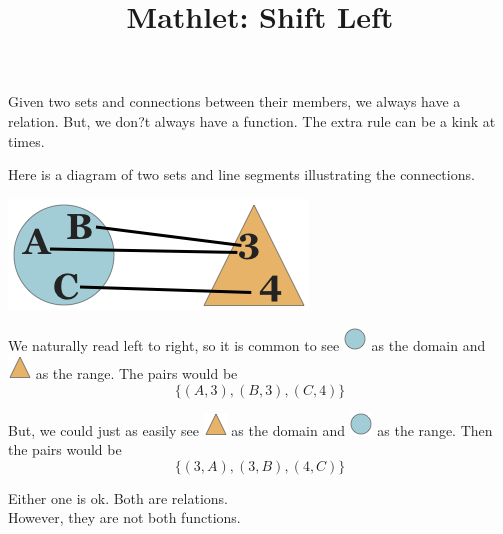 \documentclass{ximera}
\title{Mathlet: Shift Left}
\begin{document}
\begin{abstract}
\end{abstract}

\maketitle





Given two sets and connections between their members, we always have a relation. But, we don?t always have a function. The extra rule can be a kink at times. 


\begin{example}
Here is a diagram of two sets and line segments illustrating the connections.

\begin{center}
\begin{image}
\includegraphics{pics/func.png}
\end{image}
\end{center}



We naturally read left to right, so it is common to see \includegraphics{pics/circle.png} as the domain and \includegraphics{pics/triangle.png} as the range.  The pairs would be 
\[
\{ (A, 3), (B, 3), (C, 4) \}
\]


But, we could just as easily see \includegraphics{pics/triangle.png} as the domain and \includegraphics{pics/circle.png} as the range.  Then the pairs would be
\[
\{ (3, A), (3, B), (4, C) \}
\]


Either one is ok. Both are relations. \\
However, they are not both functions. \\
\quad \\


\end{example}
\end{document}
